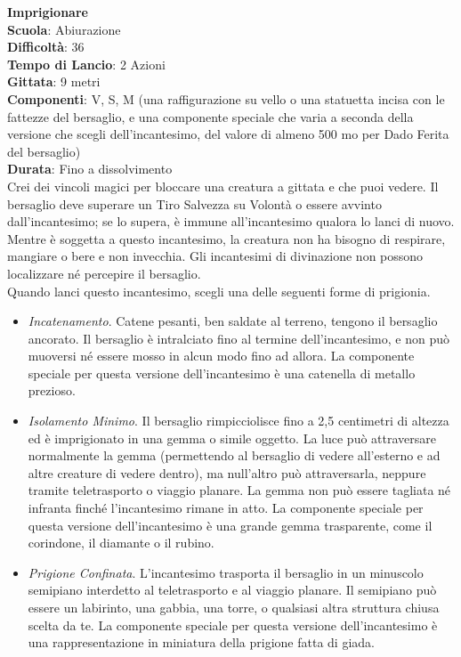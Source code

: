 \begin{multicols}{2}
\medskip\textbf{Imprigionare}\\
\textbf{Scuola}: Abiurazione\\
\textbf{Difficoltà}: 36\\
\textbf{Tempo di Lancio}: 2 Azioni\\
\textbf{Gittata}: 9 metri\\
\textbf{Componenti}: V, S, M (una raffigurazione su vello o una statuetta incisa con le fattezze del bersaglio, e una componente speciale che varia a seconda della versione che scegli dell'incantesimo, del valore di almeno 500 mo per Dado Ferita del bersaglio)\\
\textbf{Durata}: Fino a dissolvimento\\
Crei dei vincoli magici per bloccare una creatura a gittata e che puoi vedere. Il bersaglio deve superare un Tiro Salvezza su Volontà o essere avvinto dall'incantesimo; se lo supera, è immune all'incantesimo qualora lo lanci di nuovo. Mentre è soggetta a questo incantesimo, la creatura non ha bisogno di respirare, mangiare o bere e non invecchia. Gli incantesimi di divinazione non possono localizzare né percepire il bersaglio.\\
Quando lanci questo incantesimo, scegli una delle seguenti forme di prigionia.
\medskip
\begin{itemize}
\item
\textit{Incatenamento}. Catene pesanti, ben saldate al terreno, tengono il bersaglio ancorato. Il bersaglio è intralciato fino al termine dell'incantesimo, e non può muoversi né essere mosso in alcun modo fino ad allora. La componente speciale per questa versione dell'incantesimo è una catenella di metallo prezioso. 
\item
\textit{Isolamento Minimo}. Il bersaglio rimpicciolisce fino a 2,5 centimetri di altezza ed è imprigionato in una gemma o simile oggetto. La luce può attraversare normalmente la gemma (permettendo al bersaglio di vedere all'esterno e ad altre creature di vedere dentro), ma null'altro può attraversarla, neppure tramite teletrasporto o viaggio planare. La gemma non può essere tagliata né infranta finché l'incantesimo rimane in atto. La componente speciale per questa versione dell'incantesimo è una grande gemma trasparente, come il corindone, il diamante o il rubino.
\item
\textit{Prigione Confinata}. L'incantesimo trasporta il bersaglio in un minuscolo semipiano interdetto al teletrasporto e al viaggio planare. Il semipiano può essere un labirinto, una gabbia, una torre, o qualsiasi altra struttura chiusa scelta da te. La componente speciale per questa versione dell'incantesimo è una rappresentazione in miniatura della prigione fatta di giada.

\end{itemize}
\end{multicols}
